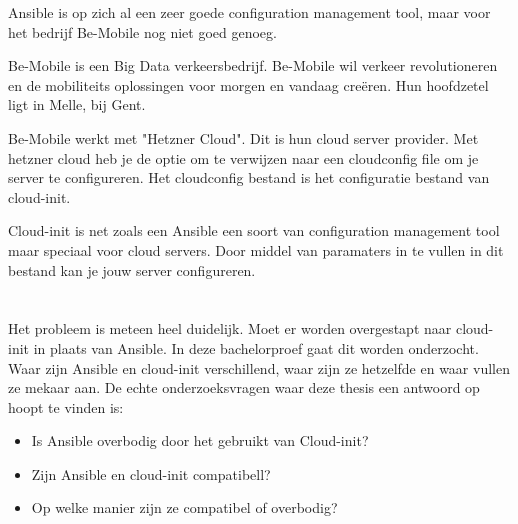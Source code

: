 Ansible is op zich al een zeer goede configuration management tool, maar voor het bedrijf Be-Mobile nog niet goed genoeg. 

Be-Mobile is een Big Data verkeersbedrijf. Be-Mobile wil verkeer revolutioneren en de mobiliteits oplossingen voor morgen en vandaag creëren. Hun hoofdzetel ligt in Melle, bij Gent. 

Be-Mobile werkt met "Hetzner Cloud". Dit is hun cloud server provider. Met hetzner cloud heb je de optie om te verwijzen naar een cloudconfig file om je server te configureren. Het cloudconfig bestand is het configuratie  bestand van cloud-init. 

Cloud-init is net zoals een Ansible een soort van configuration management tool maar speciaal voor cloud servers. Door middel van paramaters in te vullen in dit bestand kan je jouw server configureren.
 


\section{}
\label{sec:probleemstellingonderzoeksvraag}

Het probleem is meteen heel duidelijk. Moet er worden overgestapt naar cloud-init in plaats van Ansible. In deze bachelorproef gaat dit worden onderzocht. Waar zijn Ansible en cloud-init verschillend, waar zijn ze hetzelfde en waar vullen ze mekaar aan. De echte onderzoeksvragen waar deze thesis een antwoord op hoopt te vinden is:

\begin{itemize}
    \item Is Ansible overbodig door het gebruikt van Cloud-init?
    \item Zijn Ansible en cloud-init compatibell?
    \item Op welke manier zijn ze compatibel of overbodig?
\end{itemize}



